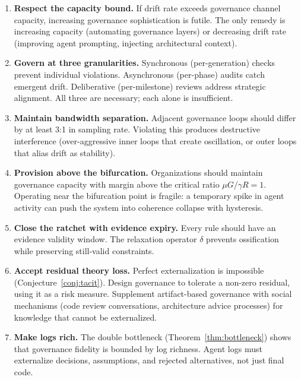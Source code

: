 \documentclass[11pt, a4paper, copyright]{googledeepmind}
\begin{document}
\begin{enumerate}
    \item \textbf{Respect the capacity bound.} If drift rate exceeds governance channel capacity, increasing governance sophistication is futile. The only remedy is increasing capacity (automating governance layers) or decreasing drift rate (improving agent prompting, injecting architectural context).

    \item \textbf{Govern at three granularities.} Synchronous (per-generation) checks prevent individual violations. Asynchronous (per-phase) audits catch emergent drift. Deliberative (per-milestone) reviews address strategic alignment. All three are necessary; each alone is insufficient.

    \item \textbf{Maintain bandwidth separation.} Adjacent governance loops should differ by at least 3:1 in sampling rate. Violating this produces destructive interference (over-aggressive inner loops that create oscillation, or outer loops that alias drift as stability).

    \item \textbf{Provision above the bifurcation.} Organizations should maintain governance capacity with margin above the critical ratio $\mu G / \gamma R = 1$. Operating near the bifurcation point is fragile: a temporary spike in agent activity can push the system into coherence collapse with hysteresis.

    \item \textbf{Close the ratchet with evidence expiry.} Every rule should have an evidence validity window. The relaxation operator $\delta$ prevents ossification while preserving still-valid constraints.

    \item \textbf{Accept residual theory loss.} Perfect externalization is impossible (Conjecture~\ref{conj:tacit}). Design governance to tolerate a non-zero residual, using it as a risk measure. Supplement artifact-based governance with social mechanisms (code review conversations, architecture advice processes) for knowledge that cannot be externalized.

    \item \textbf{Make logs rich.} The double bottleneck (Theorem~\ref{thm:bottleneck}) shows that governance fidelity is bounded by log richness. Agent logs must externalize decisions, assumptions, and rejected alternatives, not just final code.


\end{enumerate}
\end{document}
